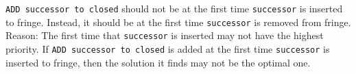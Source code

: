 \begin{pr}
\texttt{ADD successor to closed} should not be at the first time \texttt{successor} is inserted to fringe. Instead, it should be at the first time \texttt{successor} is removed from fringe. Reason: The first time that \texttt{successor} is inserted may not have the highest priority. If \texttt{ADD successor to closed} is added at the first time \texttt{successor} is inserted to fringe, then the solution it finds may not be the optimal one.
\end{pr}

